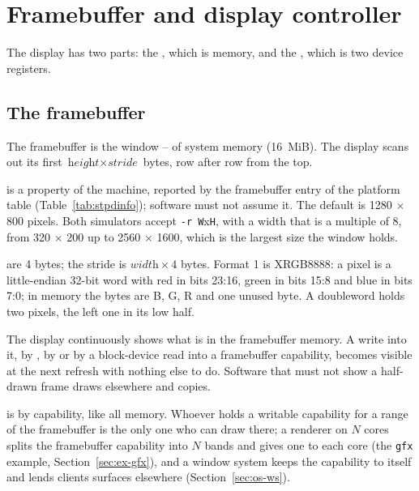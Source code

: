 \section{Framebuffer and display controller}\label{sec:fbctl}

The display has two parts: the , which is memory, and the , which is two device registers.

\subsection{The framebuffer}
The framebuffer is the window -- of system memory (16~MiB). The display scans
out its first $\textit{height} \times \textit{stride}$ bytes, row after row from the top.

\begin{description}[leftmargin=1em,style=nextline]
\item[Geometry] is a property of the machine, reported by the framebuffer entry of the platform table
  (Table~\ref{tab:stpdinfo}); software must not assume it. The default is 1280 $\times$ 800 pixels. Both
  simulators accept \texttt{-r W}x\texttt{H}, with a width that is a multiple of 8, from 320 $\times$ 200
  up to 2560 $\times$ 1600, which is the largest size the window holds.
\item[Pixels] are 4 bytes; the stride is $\textit{width} \times 4$ bytes. Format 1 is XRGB8888: a pixel is
  a little-endian 32-bit word with red in bits 23:16, green in bits 15:8 and blue in bits 7:0; in
  memory the bytes are B, G, R and one unused byte. A doubleword holds two pixels, the left one in its
  low half.
\item[Scanout is live.] The display continuously shows what is in the framebuffer memory. A write into
  it, by , by  or by a block-device read into a framebuffer capability, becomes
  visible at the next refresh with nothing else to do. Software that must not show a half-drawn frame
  draws elsewhere and copies.
\item[Ownership] is by capability, like all memory. Whoever holds a writable capability for a range of
  the framebuffer is the only one who can draw there; a renderer on $N$ cores splits the framebuffer
  capability into $N$ bands and gives one to each core (the \texttt{gfx} example,
  Section~\ref{sec:ex-gfx}), and a window system keeps the capability to itself and lends clients
  surfaces elsewhere (Section~\ref{sec:os-ws}).
\end{description}

